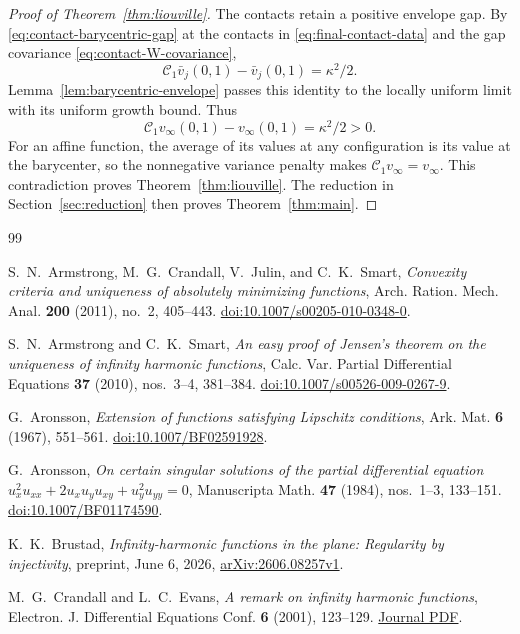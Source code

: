 \documentclass[11pt]{article}
\numberwithin{equation}{section}
\theoremstyle{definition}
\theoremstyle{remark}
\newcommand{\Cenv}{\mathcal{C}}
\begin{document}
\begin{proof}[Proof of Theorem~\ref{thm:liouville}]
The contacts retain a positive envelope gap. By \eqref{eq:contact-barycentric-gap} at the contacts in \eqref{eq:final-contact-data} and the gap covariance \eqref{eq:contact-W-covariance},
\[
  \Cenv_1\bar v_j(0,1)-\bar v_j(0,1)=\kappa^2/2.
\]
Lemma~\ref{lem:barycentric-envelope} passes this identity to the locally uniform limit with its uniform growth bound. Thus
\[
  \Cenv_1v_\infty(0,1)-v_\infty(0,1)=\kappa^2/2>0.
\]
For an affine function, the average of its values at any configuration is its value at the barycenter, so the nonnegative variance penalty makes $\Cenv_1v_\infty=v_\infty$. This contradiction proves Theorem~\ref{thm:liouville}. The reduction in Section~\ref{sec:reduction} then proves Theorem~\ref{thm:main}.
\end{proof}

\begin{thebibliography}{99}

S.~N.~Armstrong, M.~G.~Crandall, V.~Julin, and C.~K.~Smart,
\emph{Convexity criteria and uniqueness of absolutely minimizing functions},
Arch. Ration. Mech. Anal. \textbf{200} (2011), no.~2, 405--443.
\href{https://doi.org/10.1007/s00205-010-0348-0}{doi:10.1007/s00205-010-0348-0}.

S.~N.~Armstrong and C.~K.~Smart,
\emph{An easy proof of Jensen's theorem on the uniqueness of infinity harmonic functions},
Calc. Var. Partial Differential Equations \textbf{37} (2010), nos.~3--4, 381--384.
\href{https://doi.org/10.1007/s00526-009-0267-9}{doi:10.1007/s00526-009-0267-9}.

G.~Aronsson,
\emph{Extension of functions satisfying Lipschitz conditions},
Ark. Mat. \textbf{6} (1967), 551--561.
\href{https://doi.org/10.1007/BF02591928}{doi:10.1007/BF02591928}.

G.~Aronsson,
\emph{On certain singular solutions of the partial differential equation
  $u_x^2u_{xx}+2u_xu_yu_{xy}+u_y^2u_{yy}=0$},
Manuscripta Math. \textbf{47} (1984), nos.~1--3, 133--151.
\href{https://doi.org/10.1007/BF01174590}{doi:10.1007/BF01174590}.

K.~K.~Brustad,
\emph{Infinity-harmonic functions in the plane: Regularity by injectivity},
preprint, June 6, 2026,
\href{https://arxiv.org/abs/2606.08257v1}{arXiv:2606.08257v1}.

M.~G.~Crandall and L.~C.~Evans,
\emph{A remark on infinity harmonic functions},
Electron. J. Differential Equations Conf. \textbf{6} (2001), 123--129.
\href{https://ejde.math.txstate.edu/conf-proc/06/c6/crandall.pdf}{Journal PDF}.


\end{thebibliography}
\end{document}
